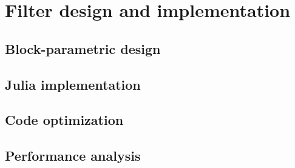 \section{Filter design and implementation}\label{sec:filter}



\subsection{Block-parametric design}\label{sec:aaaa}


\subsection{Julia implementation}\label{sec:aaaa}


\subsection{Code optimization}\label{sec:aaaa}


\subsection{Performance analysis}\label{sec:aaaa}

